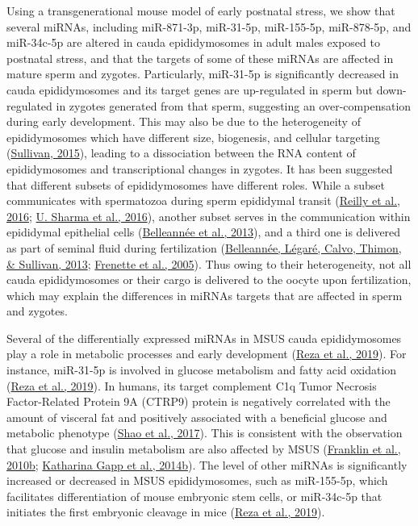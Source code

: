 \documentclass[12pt,twoside]{reedthesis}
\begin{document}
Using a transgenerational mouse model of early postnatal stress, we show
that several miRNAs, including miR-871-3p, miR-31-5p, miR-155-5p,
miR-878-5p, and miR-34c-5p are altered in cauda epididymosomes in adult
males exposed to postnatal stress, and that the targets of some of these
miRNAs are affected in mature sperm and zygotes. Particularly, miR-31-5p
is significantly decreased in cauda epididymosomes and its target genes
are up-regulated in sperm but down-regulated in zygotes generated from
that sperm, suggesting an over-compensation during early development.
This may also be due to the heterogeneity of epididymosomes which have
different size, biogenesis, and cellular targeting (\protect\hyperlink{ref-sullivan_2015}{Sullivan, 2015}),
leading to a dissociation between the RNA content of epididymosomes and
transcriptional changes in zygotes. It has been suggested that different
subsets of epididymosomes have different roles. While a subset
communicates with spermatozoa during sperm epididymal transit
(\protect\hyperlink{ref-reilly_2016}{Reilly et al., 2016}; \protect\hyperlink{ref-sharma_2016}{U. Sharma et al., 2016}), another subset serves in the communication
within epididymal epithelial cells (\protect\hyperlink{ref-belleanne_2013a}{Belleannée et al., 2013}), and a third one
is delivered as part of seminal fluid during fertilization
(\protect\hyperlink{ref-belleanne_2013}{Belleannée, Légaré, Calvo, Thimon, \& Sullivan, 2013}; \protect\hyperlink{ref-frenette_2005}{Frenette et al., 2005}). Thus owing to their heterogeneity,
not all cauda epididymosomes or their cargo is delivered to the oocyte
upon fertilization, which may explain the differences in miRNAs targets
that are affected in sperm and zygotes.

Several of the differentially expressed miRNAs in MSUS cauda
epididymosomes play a role in metabolic processes and early development
(\protect\hyperlink{ref-reza_2019}{Reza et al., 2019}). For instance, miR-31-5p is involved in glucose metabolism
and fatty acid oxidation (\protect\hyperlink{ref-reza_2019}{Reza et al., 2019}). In humans, its target complement
C1q Tumor Necrosis Factor-Related Protein 9A (CTRP9) protein is
negatively correlated with the amount of visceral fat and positively
associated with a beneficial glucose and metabolic phenotype
(\protect\hyperlink{ref-shao_2017}{Shao et al., 2017}). This is consistent with the observation that glucose and
insulin metabolism are also affected by MSUS (\protect\hyperlink{ref-franklin_2010}{Franklin et al., 2010b}; \protect\hyperlink{ref-gapp_2014}{Katharina Gapp et al., 2014b}). The level of other miRNAs is significantly increased or
decreased in MSUS epididymosomes, such as miR-155-5p, which facilitates
differentiation of mouse embryonic stem cells, or miR-34c-5p that
initiates the first embryonic cleavage in mice (\protect\hyperlink{ref-reza_2019}{Reza et al., 2019}).
\end{document}
